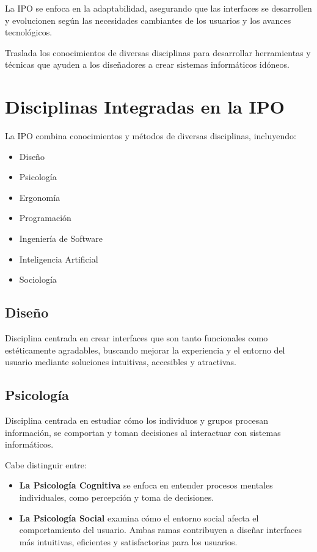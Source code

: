 \documentclass{report}
\begin{document}
\vspace{4mm} %

La IPO se enfoca en la adaptabilidad, asegurando que las interfaces se desarrollen y evolucionen según las necesidades cambiantes de los usuarios y los avances tecnológicos. 

\vspace{4mm}

Traslada los conocimientos de diversas disciplinas para desarrollar herramientas y técnicas que ayuden a los diseñadores a crear sistemas informáticos idóneos.

\section{Disciplinas Integradas en la IPO}
La IPO combina conocimientos y métodos de diversas disciplinas, incluyendo:
\begin{multicols}{3}
\begin{itemize}[itemsep=0.1em] %
    \item Diseño
    \item Psicología
    \item Ergonomía
    \item Programación
    \item Ingeniería de Software
    \item Inteligencia Artificial
    \item Sociología
\end{itemize}
\end{multicols}

\subsection{Diseño}
Disciplina centrada en crear interfaces que son tanto funcionales como estéticamente agradables, buscando mejorar la experiencia y el entorno del usuario mediante soluciones intuitivas, accesibles y atractivas.

\subsection{Psicología}
Disciplina centrada en estudiar cómo los individuos y grupos procesan información, se comportan y toman decisiones al interactuar con sistemas informáticos. 

Cabe distinguir entre:
    \begin{itemize}
        \item \textbf{La Psicología Cognitiva} se enfoca en entender procesos mentales individuales, como percepción y toma de decisiones.
        \item \textbf{La Psicología Social} examina cómo el entorno social afecta el comportamiento del usuario. Ambas ramas contribuyen a diseñar interfaces más intuitivas, eficientes y satisfactorias para los usuarios.
    \end{itemize}
\end{document}
